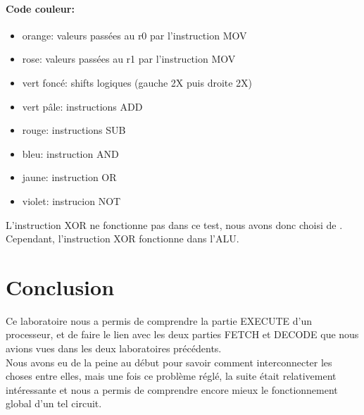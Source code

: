 \documentclass[a4paper]{article} %
\begin{document}
\paragraph{Code couleur:}
\begin{itemize}
    \item     orange: valeurs passées au r0 par l'instruction MOV
    \item     rose: valeurs passées au r1 par l'instruction MOV
    \item     vert foncé: shifts logiques (gauche 2X puis droite 2X)
    \item     vert pâle: instructions ADD
    \item     rouge: instructions SUB
    \item     bleu: instruction AND
    \item     jaune: instruction OR
    \item     violet: instrucion NOT
\end{itemize}

L'instruction XOR ne fonctionne pas dans ce test, nous avons donc choisi de . Cependant, l'instruction XOR fonctionne dans l'ALU.

\section{Conclusion}
Ce laboratoire nous a permis de comprendre la partie EXECUTE d'un processeur, et de faire le lien avec les deux parties FETCH et DECODE que nous avions vues dans les deux laboratoires précédents.\\
Nous avons eu de la peine au début pour savoir comment interconnecter les choses entre elles, mais une fois ce problème réglé, la suite était relativement intéressante et nous a permis de comprendre encore mieux le fonctionnement global d'un tel circuit.
\end{document}
